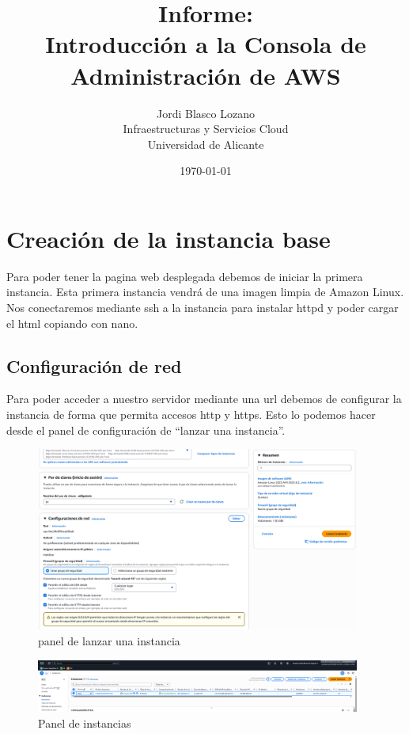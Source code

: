 \documentclass{article}
\title{Informe: \\ Introducción a la Consola de Administración de AWS}
\author{
	Jordi Blasco Lozano \\
	\small Infraestructuras y Servicios Cloud \\
	\small Universidad de Alicante
}
\date{\today}
\begin{document}
	
	\maketitle

	\begin{abstract}
	\noindent 
	\end{abstract}

	\tableofcontents

	\newpage

	\section{Creación de la instancia base}

		Para poder tener la pagina web desplegada debemos de iniciar la primera instancia. Esta primera instancia vendrá de una imagen limpia de Amazon Linux. Nos conectaremos mediante ssh a la instancia para instalar httpd y poder cargar el html copiando con nano.

	\subsection{Configuración de red}

		\noindent Para poder acceder a nuestro servidor mediante una url debemos de configurar la instancia de forma que permita accesos http y https. Esto lo podemos hacer desde el panel de configuración de ``lanzar una instancia''. 



	\begin{figure}[H]
	\centering
	\includegraphics[width=0.95\textwidth]{configuracion_IC2.png}
	\caption{panel de lanzar una instancia}
	\end{figure}

	\begin{figure}[H]
	\centering
	\includegraphics[width=0.95\textwidth]{pestanya_instancias.png}
	\caption{Panel de instancias}
	\end{figure}
\newpage
\end{document}
